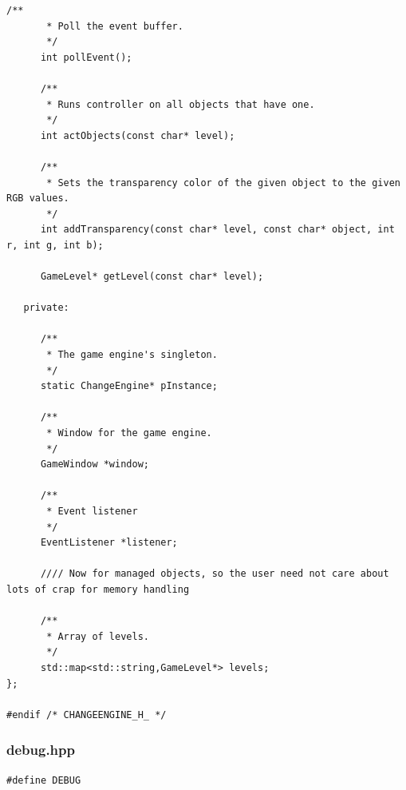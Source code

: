 \documentclass[12pt]{article}
\begin{document}
\begin{lstlisting}[breaklines]
      /**
       * Poll the event buffer.
       */
      int pollEvent();
      
      /**
       * Runs controller on all objects that have one.
       */
      int actObjects(const char* level);

      /**
       * Sets the transparency color of the given object to the given RGB values.
       */
      int addTransparency(const char* level, const char* object, int r, int g, int b);
      
      GameLevel* getLevel(const char* level);
      
   private:

      /**
       * The game engine's singleton.
       */
      static ChangeEngine* pInstance;

      /**
       * Window for the game engine.
       */
      GameWindow *window;

      /**
       * Event listener
       */
      EventListener *listener;
      
      //// Now for managed objects, so the user need not care about lots of crap for memory handling
      
      /**
       * Array of levels.
       */
      std::map<std::string,GameLevel*> levels;
};

#endif /* CHANGEENGINE_H_ */
\end{lstlisting}
\subsubsection{debug.hpp}
\begin{lstlisting}[breaklines]
#define DEBUG
\end{lstlisting}
\end{document}
